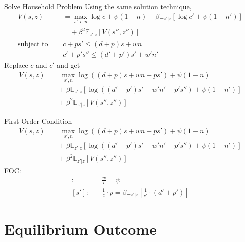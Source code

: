 \documentclass[11pt,aspectratio=43,usenames,dvipsnames]{beamer}
\theoremstyle{definition}
\begin{document}
\begin{frame}{Solve Household Problem}
\label{slide:Solve_Household_Problem}
    Using the same solution technique,
    \begin{align}
        V(s, z)
            & = \max_{s', c, n} \log c + \psi (1-n) + \beta \mathbb{E}_{z'|z}[\log c' + \psi (1-n')]
        \\
            & \quad + \beta^{2} \mathbb{E}_{z'|z} [V(s'', z'')]
        \\
        \text{subject to } \quad
            & c + ps' \le (d + p)s + wn
        \\
            & c' + p's'' \le (d' + p') s' + w' n'
    \end{align}
    Replace $ c $ and $ c' $ and get
    \begin{align}
        V(s, z)
            & = \max_{s', n} \log((d+p)s + wn - p s') + \psi (1-n)
        \\
            & \quad + \beta \mathbb{E}_{z'|z} [\log((d'+p')s' + w'n' - p's'') + \psi (1 - n')]
        \\
            & \quad + \beta^{2} \mathbb{E}_{z'|z} [V(s'', z'')]
    \end{align}
\end{frame}

\begin{frame}{First Order Condition}
\label{slide:First_Order_Condition}
    \begin{align}
        V(s, z)
            & = \max_{s', n} \log((d+p)s + wn - p s') + \psi (1-n)
        \\
            & \quad + \beta \mathbb{E}_{z'|z} [\log((d'+p')s' + w'n' - p's'') + \psi (1 - n')]
        \\
            & \quad + \beta^{2} \mathbb{E}_{z'|z} [V(s'', z'')]
    \end{align}
    FOC:
    \begin{align}
        [n]: \quad
            & \frac{w}{c} = \psi
        \\
        [s']: \quad
            & \frac{1}{c} \cdot p = \beta \mathbb{E}_{z'|z} \left[
                \frac{1}{c'} \cdot (d' + p')
            \right]
    \end{align}
\end{frame}

\section[Eqm]{Equilibrium Outcome}
\label{sec:Equilibrium_Outcome}
\end{document}
